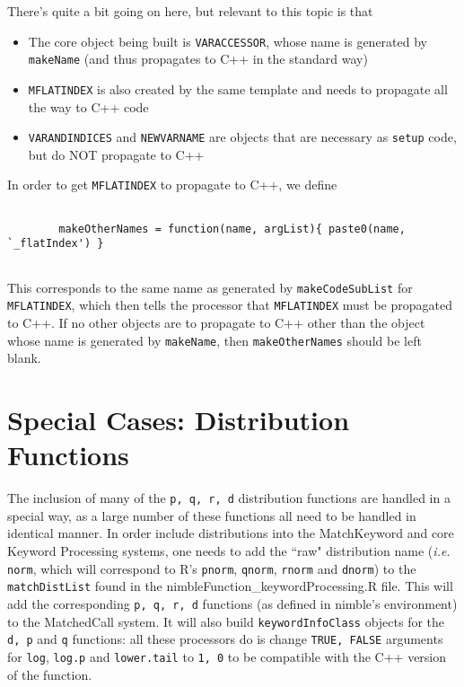 \documentclass[11pt]{article}
\numberwithin{equation}{section}
\begin{document}
	There's quite a bit going on here, but relevant to this topic is that
	
	\begin{itemize}
	
		\item The core object being built is \texttt{VARACCESSOR}, whose name is generated by \texttt{makeName} (and thus propagates to C++ in the standard way)
	
		\item \texttt{MFLATINDEX} is also created by the same template and needs to propagate all the way to C++ code
		
		\item \texttt{VARANDINDICES} and \texttt{NEWVARNAME} are objects that are necessary as \texttt{setup} code, but do NOT propagate to C++
	
	\end{itemize}
	
	In order to get \texttt{MFLATINDEX} to propagate to C++, we define
	
	\begin{verbatim}
	
		makeOtherNames = function(name, argList){ paste0(name, `_flatIndex') }
	
	\end{verbatim}
	
	This corresponds to the same name as generated by \texttt{makeCodeSubList} for \texttt{MFLATINDEX}, which then tells the processor that \texttt{MFLATINDEX} must be propagated to C++. If no other objects are to propagate to C++ other than the object whose name is generated by \texttt{makeName}, then \texttt{makeOtherNames} should be left blank. 
	
\section{Special Cases: Distribution Functions}	

	The inclusion of many of the \texttt{p, q, r, d} distribution functions are handled in a special way, as a large number of these functions all need to be handled in identical manner. In order include distributions into the MatchKeyword and core Keyword Processing systems, one needs to add the ``raw" distribution name (\emph{i.e.} \texttt{norm}, which will correspond to R's \texttt{pnorm}, \texttt{qnorm}, \texttt{rnorm} and \texttt{dnorm}) to the \texttt{matchDistList} found in the nimbleFunction\_keywordProcessing.R file. This will add the corresponding \texttt{p, q, r, d} functions (as defined in nimble's environment) to the MatchedCall system. It will also build \texttt{keywordInfoClass} objects for the \texttt{d, p} and \texttt{q} functions: all these processors do is change \texttt{TRUE, FALSE} arguments for \texttt{log}, \texttt{log.p} and \texttt{lower.tail} to \texttt{1, 0} to be compatible with the C++ version of the function. 
\end{document}
